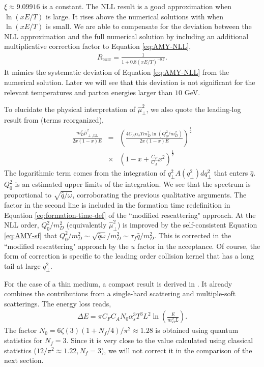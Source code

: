 \documentclass[aps, prc, reprint, amsmath, groupedaddress, nofootinbib]{revtex4-1}
\begin{document}
$\xi\approx9.09916$ is a constant. 
The NLL result is a good approximation when $\ln(xE/T)$ is large. 
It rises above the numerical solutions with  when $\ln(xE/T)$ is small.
We are able to compensate for the deviation between the NLL approximation and the full numerical solution by including an additional multiplicative correction factor to Equation \ref{eq:AMY-NLL}, 
\begin{eqnarray}\label{eq:correction}
R_{\textrm{corr}} = \frac{1}{1+0.8\left(xE/T\right)^{-0.7}}.
\end{eqnarray}
It mimics the systematic deviation of Equation \ref{eq:AMY-NLL} from the numerical solution. 
Later we will see that this deviation is not significant for the relevant temperatures and parton energies larger than $10$ GeV.

To elucidate the physical interpretation of $\hat{\mu}_\perp^2$, we also quote the leading-log result from \cite{Arnold:2008zu} (terms reorganized),
\begin{eqnarray}\label{eq:AMY-LL}
\nonumber
\frac{m_D^2\hat{\mu}_{\perp, \textrm{LL}}^2}{2x(1-x)E} &=& 
\left(\frac{4C_A\alpha_s T m_D^2 \ln\left(Q_0^2/m_D^2\right)}{2x(1-x)E}\right)^{\frac{1}{2}}\\
&\times& \left(1-x+\frac{C_F}{C_A}x^2\right)^{\frac{1}{2}}
\end{eqnarray}
The logarithmic term comes from the integration of $q_\perp^2 A(q_\perp^2)dq_\perp^2$ that enters $\hat{q}$.
$Q_0^2$ is an estimated upper limits of the integration.
We see that the spectrum is proportional to $\sqrt{\hat{q}/\omega}$, corroborating the previous qualitative arguments.
The factor in the second line is included in the formation time redefinition in Equation \ref{eq:formation-time-def} of the ``modified rescattering" approach.
At the NLL order, $Q_0^2/m_D^2$ (equivalently $\hat{\mu}_\perp^2$) is improved by the self-consistent Equation \ref{eq:AMY-sf} that $Q_0^2/m_D^2 \sim \sqrt{\hat{q}\omega}/m_D^2\sim \tau_f\hat{q}/m_D^2$. 
This is corrected in the ``modified rescattering" approach by the $u$ factor in the acceptance. 
Of course, the form of correction is specific to the leading order collision kernel that has a long tail at large $q_\perp^2$.

For the case of a thin medium, a compact result is derived in \cite{Arnold:2009mr}. 
It already combines the contributions from a single-hard scattering and multiple-soft scatterings.
The energy loss reads,
\begin{eqnarray}\label{eq:dE-thin}
\Delta E = \pi C_F C_A N_0 \alpha_s^3 T^3 L^2 \ln\left(\frac{E}{m_D^2 L}\right).
\end{eqnarray}
The factor $N_0 = 6\zeta(3)(1+N_f/4)/\pi^2 \approx 1.28$ 
is obtained using quantum statistics for $N_f=3$. Since it is very close to the value calculated using classical statistics ($12/\pi^2 \approx 1.22, N_f=3$), we will not correct it in the comparison of the next section.
\end{document}
